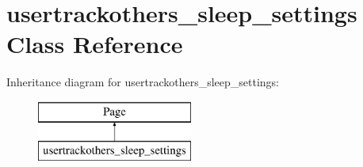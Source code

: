\hypertarget{classusertrackothers__sleep__settings}{\section{usertrackothers\-\_\-sleep\-\_\-settings Class Reference}
\label{classusertrackothers__sleep__settings}
}
Inheritance diagram for usertrackothers\-\_\-sleep\-\_\-settings\-:\begin{figure}[H]
\begin{center}
\leavevmode
\includegraphics[height=2.000000cm]{classusertrackothers__sleep__settings}
\end{center}
\end{figure}
